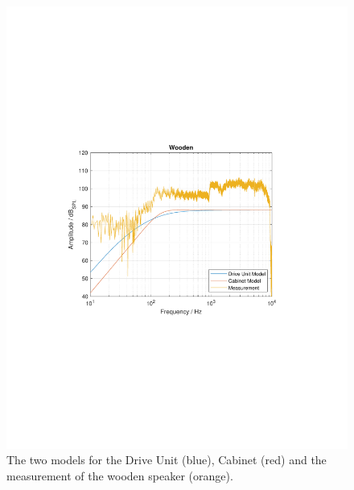 \begin{figure}
	\centering
	\includegraphics[width=0.7\linewidth, clip, trim={3.9cm 8.4cm 4.5cm 8.5cm}]{gfx/Results/AllCompareWooden.pdf}
	\caption{The two models for the Drive Unit (blue), Cabinet (red) and the measurement of the wooden speaker (orange).}
	\label{fig:allcomparewooden}
\end{figure}
\FloatBarrier